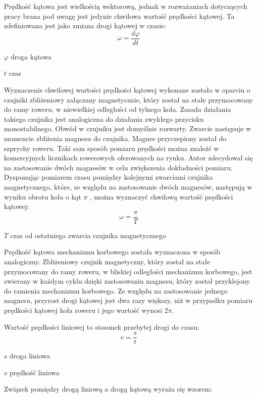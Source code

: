 Prędkość kątowa jest wielkością wektorową, jednak w rozważaniach dotyczących pracy brana pod uwagę jest jedynie chwilowa wartość prędkości kątowej. Ta zdefiniowana jest jako zmiana drogi kątowej w czasie:
\begin{equation}
    \omega = \frac{d\varphi}{dt}
\end{equation}
\begin{eqwhere}[2cm]
	\item[$\varphi$] droga kątowa
	\item[$t$] czas
\end{eqwhere}
Wyznaczenie chwilowej wartości prędkości kątowej wykonane zostało w oparciu o czujniki zbliżeniowy załączany magnetycznie, który został na stałe przymocowany do ramy roweru, w niewielkiej odległości od tylnego koła. Zasada działania takiego czujnika jest analogiczna do działania zwykłego przycisku monostabilnego. Obwód w czujniku jest domyślnie rozwarty. Zwarcie następuje w momencie zbliżenia magnesu do czujnika. Magnes przyczepiony został do szprychy roweru. Taki sam sposób pomiaru prędkości można znaleźć w komercyjnych licznikach rowerowych oferowanych na rynku. Autor zdecydował się na zastosowanie dwóch magnesów w celu zwiększenia dokładności pomiaru. Dysponując pomiarem czasu pomiędzy kolejnymi zwarciami czujnika magnetycznego, które, ze względu na zastosowanie dwóch magnesów, następują w wyniku obrotu koła o kąt $\pi$ , można wyznaczyć chwilową wartość prędkości kątowej: 
\begin{equation}
    \omega = \frac{\pi}{T}
\end{equation}
\begin{eqwhere}[2cm]
	\item[$T$] czas od ostatniego zwarcia czujnika magnetycznego
\end{eqwhere}
Prędkość kątowa mechanizmu korbowego została wyznaczona w sposób analogiczny. Zbliżeniowy czujnik magnetyczny, który został na stałe przymocowany do ramy roweru, w bliskiej odległości mechanizmu korbowego, jest zwierany w każdym cyklu dzięki zastosowaniu magnesu, który został przyklejony do ramienia mechanizmu korbowego. Ze względu na zastosowanie jednego magnesu, przyrost drogi kątowej jest dwa razy większy, niż w przypadku pomiaru prędkości kątowej koła roweru i jego wartość wynosi 2$\pi$.

Wartość prędkości liniowej to stosunek przebytej drogi do czasu:
\begin{equation}
    v = \frac{s}{t}
\end{equation}
\begin{eqwhere}[2cm]
	\item[$s$] droga liniowa
	\item[$v$] prędkość liniowa
\end{eqwhere}
 Związek pomiędzy drogą liniową a drogą kątową wyraża się wzorem:

